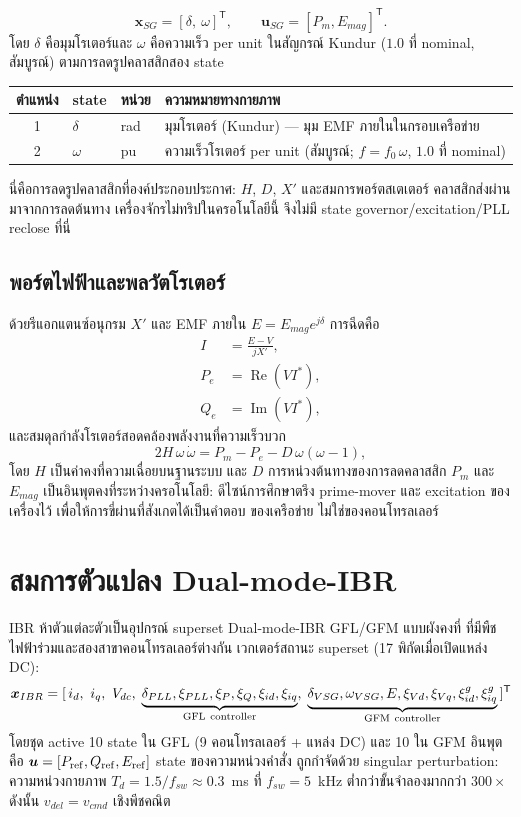 \documentclass[12pt,a4paper]{article}
\newcommand{\vect}[1]{\boldsymbol{#1}}
\begin{document}
\[
\vect x_{SG}=[\delta,\ \omega]^{\mathsf T},
\qquad \vect u_{SG}=[P_m,E_{mag}]^{\mathsf T}.
\]
โดย $\delta$ คือมุมโรเตอร์และ $\omega$ คือความเร็ว per unit ในสัญกรณ์ Kundur
($1.0$ ที่ nominal, สัมบูรณ์) ตามการลดรูปคลาสสิกสอง state
\begin{center}\footnotesize
\begin{tabularx}{\textwidth}{c l l X}
\toprule
ตำแหน่ง & state & หน่วย & ความหมายทางกายภาพ\\\midrule
1 & $\delta$ & rad & มุมโรเตอร์ (Kundur) — มุม EMF ภายในในกรอบเครือข่าย\\
2 & $\omega$ & pu & ความเร็วโรเตอร์ per unit (สัมบูรณ์; $f=f_0\,\omega$, $1.0$ ที่ nominal)\\
\bottomrule
\end{tabularx}
\end{center}
นี่คือการลดรูปคลาสสิกที่องค์ประกอบประกาศ: $H$, $D$, $X'$ และสมการพอร์ตสเตเตอร์
คลาสสิกส่งผ่านมาจากการลดต้นทาง เครื่องจักรไม่ทริปในครอโนโลยีนี้ จึงไม่มี state
governor/excitation/PLL reclose ที่นี่

\subsection{พอร์ตไฟฟ้าและพลวัตโรเตอร์}

ด้วยรีแอกแตนซ์อนุกรม $X'$ และ EMF ภายใน $E=E_{mag}e^{j\delta}$ การฉีดคือ
\begin{align}
I&=\frac{E-V}{jX'},\\
P_e&=\operatorname{Re}(V I^*),\\
Q_e&=\operatorname{Im}(V I^*),
\end{align}
และสมดุลกำลังโรเตอร์สอดคล้องพลังงานที่ความเร็วบวก
\[
2H\,\omega\,\dot\omega
   =P_m-P_e-D\,\omega(\omega-1),
\]
โดย $H$ เป็นค่าคงที่ความเฉื่อยบนฐานระบบ และ $D$ การหน่วงต้นทางของการลดคลาสสิก
$P_m$ และ $E_{mag}$ เป็นอินพุตคงที่ระหว่างครอโนโลยี: ดีไซน์การศึกษาตรึง
prime-mover และ excitation ของเครื่องไว้ เพื่อให้การขี่ผ่านที่สังเกตได้เป็นคำตอบ
ของเครือข่าย ไม่ใช่ของคอนโทรลเลอร์

\section{สมการตัวแปลง Dual-mode-IBR}
\label{sec:ibr}

IBR ห้าตัวแต่ละตัวเป็นอุปกรณ์ superset Dual-mode-IBR GFL/GFM แบบผังคงที่
ที่มีพืชไฟฟ้าร่วมและสองสาขาคอนโทรลเลอร์ต่างกัน เวกเตอร์สถานะ superset
(17 พิกัดเมื่อเปิดแหล่ง DC):
\[
\vect x_{IBR}=[\,i_d,\ i_q,\ V_{dc},\;
\underbrace{\delta_{PLL},\xi_{PLL},\xi_P,\xi_Q,\xi_{id},\xi_{iq}}_{\rm GFL\ controller},\;
\underbrace{\delta_{VSG},\omega_{VSG},E,\xi_{Vd},\xi_{Vq},\xi_{id}^{g},\xi_{iq}^{g}}_{\rm GFM\ controller}\,]^{\mathsf T}
\]
โดยชุด active 10 state ใน GFL (9 คอนโทรลเลอร์ + แหล่ง DC) และ 10 ใน GFM
อินพุตคือ $\vect u=[P_{\rm ref},Q_{\rm ref},E_{\rm ref}]$ state ของความหน่วงคำสั่ง
ถูกกำจัดด้วย singular perturbation: ความหน่วงกายภาพ $T_d=1.5/f_{sw}\approx0.3$~ms
ที่ $f_{sw}=5$~kHz ต่ำกว่าขั้นจำลองมากกว่า $300\times$ ดังนั้น $v_{del}=v_{cmd}$
เชิงพีชคณิต
\end{document}
